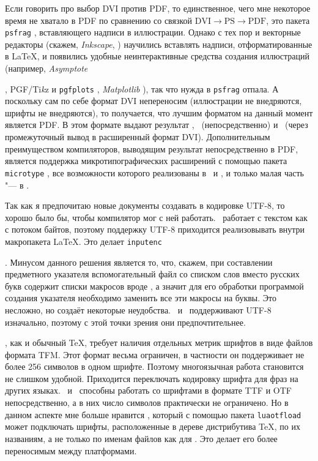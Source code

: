\documentclass[a4paper,12pt,hyphens]{article}
\newcommand\softname[1]{\textit{#1}}
\newcommand\package[1]{\texttt{#1}}
\newcommand\lcmd[1]{\texttt{#1}}
\begin{document}
Если говорить про выбор DVI против PDF, то единственное, чего мне некоторое время
не хватало в PDF по сравнению со связкой $\text{DVI}\to\text{PS}\to\text{PDF}$,
это пакета \package{psfrag} \parencite{ctan-psfrag}, вставляющего надписи в иллюстрации. Однако с тех
пор и векторные редакторы (скажем, \softname{Inkscape}, \cite{site-inkscape})
научились вставлять надписи,
отформатированные в \LaTeX, и появились удобные неинтерактивные средства создания
иллюстраций (например, \softname{Asymptote}
\begin{otherlanguage}{english}\parencite{site-asymptote,ctan-asymptote}\end{otherlanguage},
PGF/Ti\emph{k}z \parencite{ctan-pgf} и \package{pgfplots} \parencite{ctan-pgfplots},
\softname{Matplotlib} \parencite{site-matplotlib}), так что нужда в \package{psfrag}
отпала. А поскольку сам по себе формат DVI непереносим (иллюстрации не
внедряются, шрифты не внедряются), то получается, что лучшим форматом на данный
момент является PDF. В этом формате выдают результат \pdfTeX, \LuaTeX\ (непосредственно)
и \XeTeX\ (через промежуточный вывод в расширенный формат DVI).
Дополнительным преимуществом компиляторов, выводящим результат непосредственно в PDF,
является поддержка микротипографических расширений с помощью пакета
\package{microtype} \parencite{ctan-microtype}, все возможности которого реализованы в
\pdfTeX\ и \LuaTeX, и только малая часть "--- в \XeTeX.

Так как я предпочитаю новые документы создавать в кодировке UTF-8, то хорошо было
бы, чтобы компилятор мог с ней работать. \pdfTeX\ работает с текстом как с потоком
байтов, поэтому поддержку UTF-8 приходится реализовывать внутри макропакета \LaTeX.
Это делает \package{inputenc}
\begin{otherlanguage}{english}\parencite{ctan-inputenc,se-inputenc}\end{otherlanguage}.
Минусом данного решения является то, что, скажем,
при составлении предметного указателя вспомогательный файл со списком слов
вместо русских букв содержит списки макросов вроде \lcmd{\IeC {\cyro }},
а значит для его обработки программой создания указателя необходимо заменить
все эти макросы на буквы. Это несложно, но создаёт некоторые неудобства.
\XeTeX\ и \LuaTeX\ поддерживают UTF-8 изначально, поэтому с этой точки зрения
они предпочтительнее.

\pdfTeX, как и обычный \TeX, требует наличия отдельных метрик шрифтов в виде
файлов формата TFM. Этот формат весьма ограничен, в частности он поддерживает не
более 256 символов в одном шрифте. Поэтому многоязычная работа становится не
слишком удобной. Приходится переключать кодировку шрифта для фраз на других
языках. \XeTeX\ и \LuaTeX\ способны работать со шрифтами в формате TTF и OTF
непосредственно, а в них число символов практически не ограничено. Но в
данном аспекте мне больше нравится \LuaTeX, который с помощью пакета
\package{luaotfload} \parencite{ctan-luaotfload} может подключать шрифты, расположенные в дереве
дистрибутива \TeX, по их названиям, а не только по
именам файлов как для \XeTeX. Это делает его более переносимым между
платформами.
\end{document}

